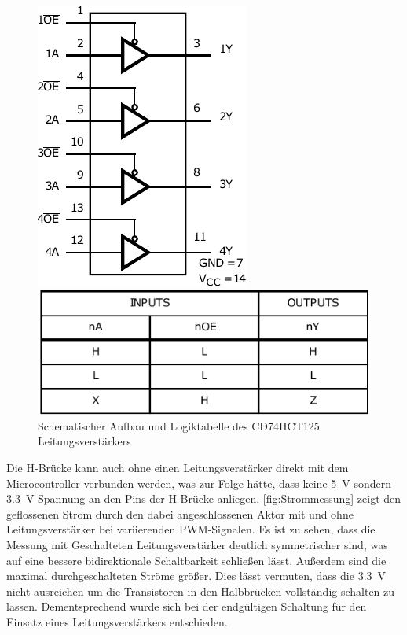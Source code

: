 \begin{figure}[H]
	\begin{center}
		\noindent\begin{minipage}[h!]{0.45\textwidth} %
			\centering
			\includegraphics[height=0.85\textwidth]{Bilder/buffer.pdf}
		\end{minipage} %
		\quad
		\begin{minipage}[h!]{0.45\textwidth} %
			\centering
			\includegraphics[height=0.3\textwidth]{Bilder/tabelle.pdf}
		\end{minipage} %
	\end{center}
	\caption{Schematischer Aufbau und Logiktabelle des CD74HCT125 Leitungsverstärkers}
	\label{fig:buffer}
\end{figure}\noindent
Die H-Brücke kann auch ohne einen Leitungsverstärker direkt mit dem Microcontroller verbunden werden, was zur Folge hätte, dass keine \SI{5}{V} sondern \SI{3,3}{V} Spannung an den Pins der H-Brücke anliegen. \autoref{fig:Strommessung} zeigt den geflossenen Strom durch den dabei angeschlossenen Aktor mit und ohne Leitungsverstärker bei variierenden PWM-Signalen. Es ist zu sehen, dass die Messung mit Geschalteten Leitungsverstärker deutlich symmetrischer sind, was auf eine bessere bidirektionale Schaltbarkeit schließen lässt. Außerdem sind die maximal durchgeschalteten Ströme größer. Dies lässt vermuten, dass die \SI{3,3}{V} nicht ausreichen um die Transistoren in den Halbbrücken vollständig schalten zu lassen. Dementsprechend wurde sich bei der endgültigen Schaltung für den Einsatz eines Leitungsverstärkers entschieden. 

